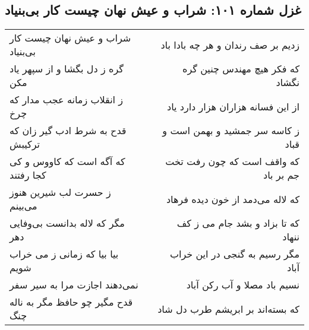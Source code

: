 \begin{center}
\section*{غزل شماره ۱۰۱: شراب و عیش نهان چیست کار بی‌بنیاد}
\label{sec:sh101}
\begin{longtable}{l p{0.5cm} r}
شراب و عیش نهان چیست کار بی‌بنیاد
&&
زدیم بر صف رندان و هر چه بادا باد
\\
گره ز دل بگشا و از سپهر یاد مکن
&&
که فکر هیچ مهندس چنین گره نگشاد
\\
ز انقلاب زمانه عجب مدار که چرخ
&&
از این فسانه هزاران هزار دارد یاد
\\
قدح به شرط ادب گیر زان که ترکیبش
&&
ز کاسه سر جمشید و بهمن است و قباد
\\
که آگه است که کاووس و کی کجا رفتند
&&
که واقف است که چون رفت تخت جم بر باد
\\
ز حسرت لب شیرین هنوز می‌بینم
&&
که لاله می‌دمد از خون دیده فرهاد
\\
مگر که لاله بدانست بی‌وفایی دهر
&&
که تا بزاد و بشد جام می ز کف ننهاد
\\
بیا بیا که زمانی ز می خراب شویم
&&
مگر رسیم به گنجی در این خراب آباد
\\
نمی‌دهند اجازت مرا به سیر سفر
&&
نسیم باد مصلا و آب رکن آباد
\\
قدح مگیر چو حافظ مگر به ناله چنگ
&&
که بسته‌اند بر ابریشم طرب دل شاد
\\
\end{longtable}
\end{center}
